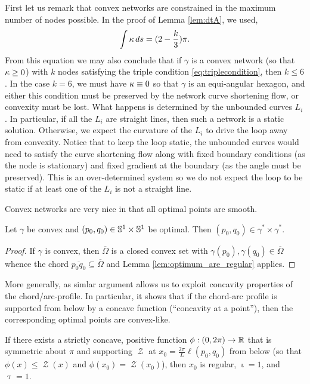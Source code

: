 \documentclass[11pt]{amsart}
\DeclareMathOperator{\chordarcprofile}{\mathcal{Z}}
\DeclareMathOperator{\tangindicator}{\iota}
\DeclareMathOperator{\norindicator}{\tau}
\begin{document}
\begin{remark}
First let us remark that convex networks are constrained in the maximum number of nodes possible. In the proof of Lemma \ref{lem:dtA}, we used,
\[
\int \operatorname{\kappa} ds = (2 - \frac{k}{3}) \pi.
\]
From this equation we may also conclude that if \(\gamma\) is a convex network (so that \(\operatorname{\kappa} \geq 0\)) with \(k\) nodes satisfying the triple condition \eqref{eq:triplecondition}, then \(k \leq 6\). In the case \(k = 6\), we must have \(\operatorname{\kappa} \equiv 0\) so that \(\gamma\) is an equi-angular hexagon, and either this condition must be preserved by the network curve shortening flow, or convexity must be lost. What happens is determined by the unbounded curves \(L_i\). In particular, if all the \(L_i\) are straight lines, then such a network is a static solution. Otherwise, we expect the curvature of the \(L_i\) to drive the loop away from convexity. Notice that to keep the loop static, the unbounded curves would need to satisfy the curve shortening flow along with fixed boundary conditions (as the node is stationary) and fixed gradient at the boundary (as the angle must be preserved). This is an over-determined system so we do not expect the loop to be static if at least one of the \(L_i\) is not a straight line.
\end{remark}

Convex networks are very nice in that all optimal points are smooth.

\begin{lemma}
\label{lem:convex_regular}

Let \(\gamma\) be convex and \((p_0,q_0) \in \mathbb{S}^1 \times \mathbb{S}^1\) be optimal. Then \((p_0, q_0) \in \gamma^{\ast} \times \gamma^{\ast}\).
\end{lemma}

\begin{proof}
If $\gamma$ is convex, then $\overline{\Omega}$ is a closed convex set with $\gamma(p_0), \gamma(q_0) \in \overline{\Omega}$ whence the chord $\overline{p_0q_0} \subseteq \overline{\Omega}$ and Lemma \ref{lem:optimum_are_regular} applies.
\end{proof}

More generally, as simlar argument allows us to exploit concavity properties of the chord/arc-profile. In particular, it shows that if the chord-arc profile is supported from below by a concave function (``concavity at a point''), then the corresponding optimal points are convex-like.

\begin{lemma}
\label{lem:concave_barrier}
If there exists a strictly concave, positive function $\phi: (0, 2\pi) \to \mathbb{R}$ that is symmetric about $\pi$ and supporting $\chordarcprofile$ at $x_0=\tfrac{2\pi}{L} \ell(p_0,q_0)$ from below (so that $\phi(x) \leq \chordarcprofile(x)$ and $\phi(x_0)=\chordarcprofile(x_0)$), then $x_0$ is regular, $\tangindicator = 1$, and $\norindicator = 1$.
\end{lemma}
\end{document}
